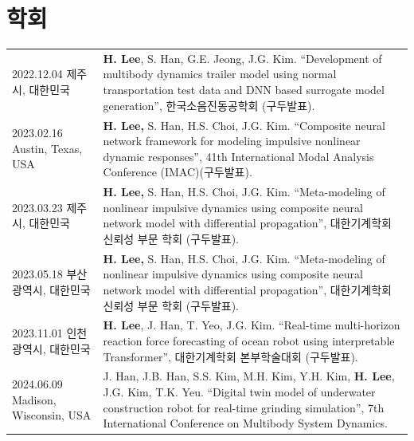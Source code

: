 \documentclass[a4paper,10pt]{extarticle}
\begin{document}
\section*{학회}
\noindent
{}
\vspace*{-.5cm}
\begin{longtable}{LR}
    {2022.12.04 \linebreak 제주시, 대한민국}               & \textbf{H. Lee}, S. Han, G.E. Jeong, J.G. Kim. “Development of multibody dynamics trailer model using normal transportation test data and DNN based surrogate model generation”, 한국소음진동공학회 (구두발표).                                       \\
    {2023.02.16 \linebreak  Austin, Texas, USA}     & \textbf{H. Lee,} S. Han, H.S. Choi, J.G. Kim. “Composite neural network framework for modeling impulsive nonlinear dynamic responses”, 41th International Modal Analysis Conference (IMAC)(구두발표).                                        \\
    {2023.03.23 \linebreak 제주시, 대한민국}               & \textbf{H. Lee,} S. Han, H.S. Choi, J.G. Kim. “Meta-modeling of nonlinear impulsive dynamics using composite neural network model with differential propagation”, 대한기계학회 신뢰성 부문 학회 (구두발표).                                               \\
    {2023.05.18 \linebreak 부산광역시, 대한민국}             & \textbf{H. Lee,} S. Han, H.S. Choi, J.G. Kim. “Meta-modeling of nonlinear impulsive dynamics using composite neural network model with differential propagation”, 대한기계학회 신뢰성 부문 학회 (구두발표).                                               \\
    {2023.11.01 \linebreak 인천광역시, 대한민국}             & \textbf{H. Lee}, J. Han, T. Yeo, J.G. Kim. “Real-time multi-horizon reaction force forecasting of ocean robot using interpretable Transformer”,  대한기계학회 본부학술대회 (구두발표).                                                                   \\
    {2024.06.09 \linebreak Madison, Wisconsin, USA} & J. Han, J.B. Han, S.S. Kim, M.H. Kim, Y.H. Kim, \textbf{H. Lee}, J.G. Kim, T.K. Yeu. “Digital twin model of underwater construction robot for real-time grinding simulation”, 7th International Conference on Multibody System Dynamics. \\
\end{longtable}
\end{document}

